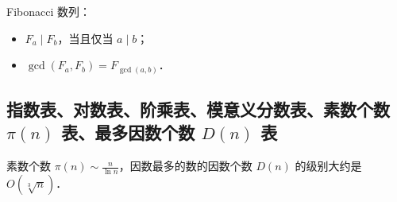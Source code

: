 Fibonacci 数列：

\begin{itemize}[noitemsep]
    \item $F_a \mid F_b$，当且仅当 $a \mid b$；
    \item $\gcd(F_a, F_b) = F_{\gcd(a, b)}$．
\end{itemize}

\newpage

\subsection{指数表、对数表、阶乘表、模意义分数表、素数个数 \texorpdfstring{$\pi(n)$}{π(n)} 表、最多因数个数 \texorpdfstring{$D(n)$}{D(n)} 表}

素数个数 $\pi(n) \sim \frac{n}{\ln n}$，因数最多的数的因数个数 $D(n)$ 的级别大约是 $O(\sqrt[3]{n})$．

\vspace{1em}

